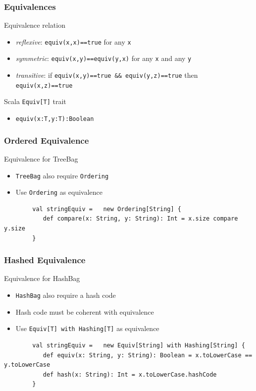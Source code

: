 \documentclass{beamer}
\begin{document}
\begin{frame}[fragile]
	\frametitle{Equivalences}
	\begin{block}{Equivalence relation}
		\begin{itemize}
			\item \emph{reflexive}: \texttt{equiv(x,x)==true}  for any \texttt{x}
			\item \emph{symmetric}: \texttt{equiv(x,y)==equiv(y,x)} for any \texttt{x} and any \texttt{y}
			\item \emph{transitive}: if \texttt{equiv(x,y)==true \&\& equiv(y,z)==true} then \texttt{equiv(x,z)==true}
		\end{itemize}
	\end{block}	
	\begin{block}{Scala \texttt{Equiv[T]} trait}
		\begin{itemize}
			\item \texttt{equiv(x:T,y:T):Boolean }
		\end{itemize}
	\end{block}	
\end{frame}

\begin{frame}[fragile]
	\frametitle{Ordered Equivalence}
	\begin{block}{Equivalence for TreeBag}
		\begin{itemize}
			\item \texttt{TreeBag} also require \texttt{Ordering}
			\item Use \texttt{Ordering} as equivalence
		\end{itemize}
	\end{block}
	\begin{lstlisting}
		val stringEquiv =   new Ordering[String] {
		   def compare(x: String, y: String): Int = x.size compare y.size
		}
	\end{lstlisting}
\end{frame}

\begin{frame}[fragile]
	\frametitle{Hashed Equivalence}
	\begin{block}{Equivalence for HashBag}
		\begin{itemize}
			\item \texttt{HashBag} also require a hash code
			\item Hash code must be coherent with equivalence
			\item Use \texttt{Equiv[T] with Hashing[T]} as equivalence
		\end{itemize}
	\end{block}
	\begin{lstlisting}
		val stringEquiv =   new Equiv[String] with Hashing[String] {
		   def equiv(x: String, y: String): Boolean = x.toLowerCase == y.toLowerCase
		   def hash(x: String): Int = x.toLowerCase.hashCode
		}
\end{lstlisting}
\end{frame}
\end{document}
